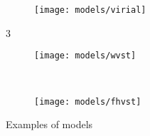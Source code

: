 \begin{figure}[p!]
\begin{subfigure}{0.3\linewidth}
        \parbox[b]{0.7\linewidth}{%
            \texttt{[image: models/virial]}}
    \end{subfigure}3
    \begin{subfigure}{0.3\linewidth}
        \parbox[c]{0.1\linewidth}{\caption{}%
            \label{fgr:pyg:wsvstex}}
        \parbox[b]{0.7\linewidth}{%
            \texttt{[image: models/wvst]}}
    \end{subfigure}
    \\
    \begin{subfigure}{0.3\linewidth}
        \parbox[c]{0.1\linewidth}{\caption{}%
            \label{fgr:pyg:fhvstex}}
        \parbox[b]{0.7\linewidth}{%
            \texttt{[image: models/fhvst]}}
    \end{subfigure}

    \caption{Examples of models }%
    \label{fgr:pyg:modelex}
\end{figure}